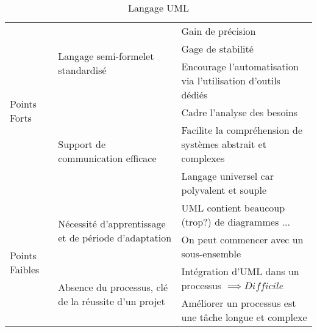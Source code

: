\begin{table}[H]
	\centering
		\caption{Langage UML}
		\label{tbl:modélisation}
		\begin{adjustbox}{max width=\textwidth}
		\begin{tabular}{l|l|l}
			\toprule
			\multirow{6}{*}{Points Forts}&\multirow{3}{*}{Langage \og semi-formel\fg et standardisé}		&  Gain de précision\\
			\cmidrule(lr){3-3}
            & & Gage de stabilité\\
            \cmidrule(lr){3-3}
            & & Encourage l’automatisation via l’utilisation d’outils dédiés\\
            \cmidrule(lr){2-2}\cmidrule(lr){3-3}
            &\multirow{3}{*}{Support de communication efficace}
			&  Cadre l'analyse des besoins\\
			\cmidrule(lr){3-3}
            & & Facilite la compréhension de systèmes abstrait et complexes\\
            \cmidrule(lr){3-3}
            & & Langage universel car polyvalent et souple\\
            \cmidrule{1-2} \cmidrule(lr){3-3}
			\multirow{4}{*}{Points Faibles}& \multirow{2}{*}{Nécessité d'apprentissage et de période d’adaptation} 
			& UML contient beaucoup (trop?) de diagrammes ...  \\
			\cmidrule(lr){3-3}
			&& On peut commencer avec un sous-ensemble \\
			\cmidrule(lr){2-2}\cmidrule(lr){3-3}
			&\multirow{2}{*}{Absence du processus, clé de la réussite d’un projet}
			& Intégration d'UML dans un processus $\implies Difficile$\\
			\cmidrule(lr){3-3}
			&& Améliorer un processus est une tâche longue et complexe\\
			\bottomrule
		\end{tabular}
		\end{adjustbox}
\end{table}


